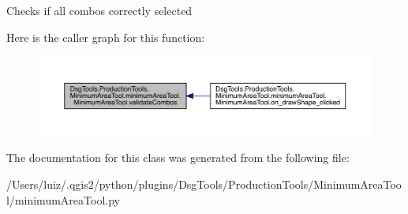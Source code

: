 \begin{DoxyVerb}Checks if all combos correctly selected
\end{DoxyVerb}
 Here is the caller graph for this function\+:
\nopagebreak
\begin{figure}[H]
\begin{center}
\leavevmode
\includegraphics[width=350pt]{class_dsg_tools_1_1_production_tools_1_1_minimum_area_tool_1_1minimum_area_tool_1_1_minimum_area_tool_a02e640ccd4ace6531fbb28ff59d8f091_icgraph}
\end{center}
\end{figure}


The documentation for this class was generated from the following file\+:\begin{DoxyCompactItemize}
\item 
/\+Users/luiz/.\+qgis2/python/plugins/\+Dsg\+Tools/\+Production\+Tools/\+Minimum\+Area\+Tool/minimum\+Area\+Tool.\+py\end{DoxyCompactItemize}

